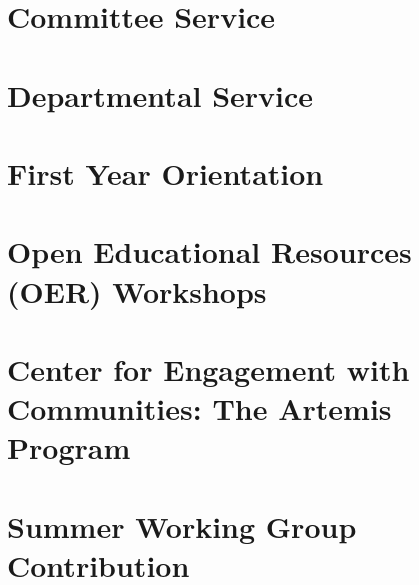 \documentclass[../../main.tex]{subfiles}
\begin{document}
\section{Committee Service}

\begin{flushleft}

\end{flushleft}

\section{Departmental Service}

\begin{flushleft}

\end{flushleft}

\section{First Year Orientation}

\begin{flushleft}

\end{flushleft}

\section{Open Educational Resources (OER) Workshops}

\begin{flushleft}

\end{flushleft}

\section{Center for Engagement with Communities: The Artemis Program}

\begin{flushleft}

\end{flushleft}

\section{Summer Working Group Contribution}

\begin{flushleft}

\end{flushleft}
\end{document}
